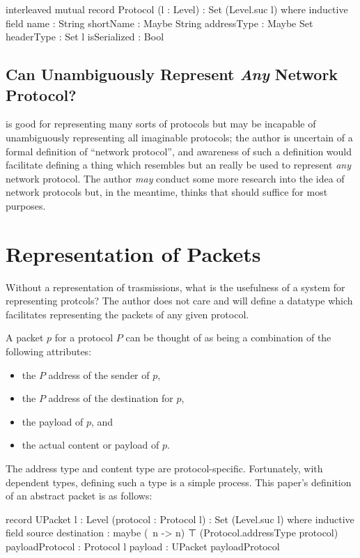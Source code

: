 \documentclass{report}
\begin{document}
\begin{code}
  interleaved mutual
    record Protocol (l : Level) : Set (Level.suc l) where
      inductive
      field
        name : String
        shortName : Maybe String
        addressType : Maybe Set
        headerType : Set l
        isSerialized : Bool
\end{code}

\section{Can  Unambiguously Represent \emph{Any} Network Protocol?}
 is good for representing many sorts of protocols but may be incapable of unambiguously representing all imaginable protocols; the author is uncertain of a formal definition of ``network protocol'', and awareness of such a definition would facilitate defining a thing which resembles  but an really be used to represent \emph{any} network protocol.  The author \emph{may} conduct some more research into the idea of network protocols but, in the meantime, thinks that  should suffice for most purposes.

\chapter{Representation of Packets}
Without a representation of trasmissions, what is the usefulness of a system for representing protcols?  The author does not care and will define a datatype which facilitates representing the packets of any given protocol.

A packet \(p\) for a protocol \(P\) can be thought of as being a combination of the following attributes:
\begin{itemize}
	\item the \(P\) address of the sender of \(p\),
	\item the \(P\) address of the destination for \(p\),
	\item the payload of \(p\), and
	\item the actual content or payload of \(p\).
\end{itemize}

The address type and content type are protocol-specific.  Fortunately, with dependent types, defining such a type is a simple process.  This paper's definition of an abstract packet is as follows:

\begin{code}
    record UPacket {l : Level} (protocol : Protocol l) : Set (Level.suc l) where
      inductive
      field
        source
         destination : maybe (\ n -> n) ⊤ (Protocol.addressType protocol)
        payloadProtocol : Protocol l
        payload : UPacket payloadProtocol
\end{code}
\end{document}
